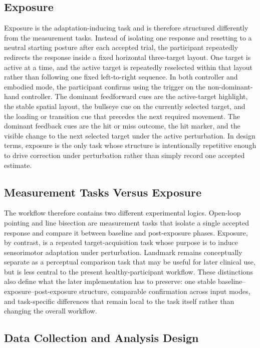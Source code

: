 \subsection{Exposure}
\label{subsec:exposure-decomposition}

Exposure is the adaptation-inducing task and is therefore structured differently from the measurement tasks. Instead of isolating one response and resetting to a neutral starting posture after each accepted trial, the participant repeatedly redirects the response inside a fixed horizontal three-target layout. One target is active at a time, and the active target is repeatedly reselected within that layout rather than following one fixed left-to-right sequence. In both controller and embodied mode, the participant confirms using the trigger on the non-dominant-hand controller. The dominant feedforward cues are the active-target highlight, the stable spatial layout, the bullseye cue on the currently selected target, and the loading or transition cue that precedes the next required movement. The dominant feedback cues are the hit or miss outcome, the hit marker, and the visible change to the next selected target under the active perturbation. In design terms, exposure is the only task whose structure is intentionally repetitive enough to drive correction under perturbation rather than simply record one accepted estimate.

\subsection{Measurement Tasks Versus Exposure}
\label{subsec:measurement-vs-exposure}

The workflow therefore contains two different experimental logics. Open-loop pointing and line bisection are measurement tasks that isolate a single accepted response and compare it between baseline and post-exposure phases. Exposure, by contrast, is a repeated target-acquisition task whose purpose is to induce sensorimotor adaptation under perturbation. Landmark remains conceptually separate as a perceptual comparison task that may be useful for later clinical use, but is less central to the present healthy-participant workflow. These distinctions also define what the later implementation has to preserve: one stable baseline--exposure--post-exposure structure, comparable confirmation across input modes, and task-specific differences that remain local to the task itself rather than changing the overall workflow.

\subsection{Data Collection and Analysis Design}
\label{subsec:analysis-layer-design}

